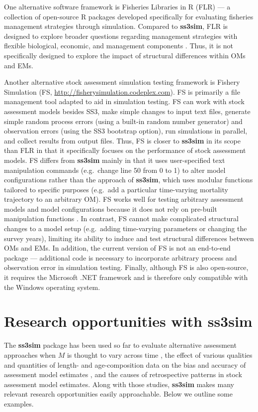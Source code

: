 \documentclass[10pt]{article}
\begin{document}
One alternative software framework is Fisheries Libraries in \textsf{R} (FLR)
\cite{kell2007} --- a collection of open-source \textsf{R} packages developed
specifically for evaluating fisheries management strategies through simulation.
Compared to \textbf{ss3sim}, FLR is designed to explore broader questions
regarding management strategies with flexible biological, economic, and
management components \cite{hillary2009}. Thus, it is not specifically designed
to explore the impact of structural differences within OMs and EMs.

Another alternative stock assessment simulation testing framework is Fishery
Simulation (FS, \url{http://fisherysimulation.codeplex.com}). FS is primarily a
file management tool adapted to aid in simulation testing. FS can work with
stock assessment models besides SS3, make simple changes to input text files,
generate simple random process errors (using a built-in random number
generator) and observation errors (using the SS3 bootstrap option), run
simulations in parallel, and collect results from output files. Thus, FS is
closer to \textbf{ss3sim} in its scope than FLR in that it specifically focuses
on the performance of stock assessment models. FS differs from \textbf{ss3sim}
mainly in that it uses user-specified text manipulation commands (e.g.~change
line 50 from 0 to 1) to alter model configurations rather than the approach of
\textbf{ss3sim}, which uses modular functions tailored to specific purposes
(e.g.~add a particular time-varying mortality trajectory to an arbitrary OM).
FS works well for testing arbitrary assessment models and model configurations
because it does not rely on pre-built manipulation functions \cite{lee2012,
  piner2011, lee2011}. In contrast, FS cannot make complicated structural
changes to a model setup (e.g.~adding time-varying parameters or changing the
survey years), limiting its ability to induce and test structural differences
between OMs and EMs. In addition, the current version of FS is not an
end-to-end package --- additional code is necessary to incorporate arbitrary
process and observation error in simulation testing. Finally, although FS is
also open-source, it requires the Microsoft .NET framework and is therefore
only compatible with the Windows operating system.

\section*{Research opportunities with ss3sim}

The \textbf{ss3sim} package has been used so far to evaluate alternative
assessment approaches when $M$ is thought to vary across time
\cite{johnson2014}, the effect of various qualities and quantities of
length- and age-composition data on the bias and accuracy of assessment model
estimates \cite{ono2014}, and the causes of retrospective patterns in stock
assessment model estimates. Along with those studies, \textbf{ss3sim} makes
many relevant research opportunities easily approachable. Below we outline some
examples.
\end{document}
